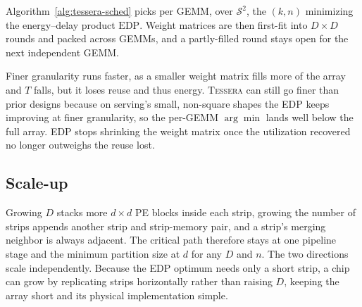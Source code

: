 Algorithm~\ref{alg:tessera-sched} picks per GEMM, over $\mathcal{S}^2$,
the $(k,n)$ minimizing the energy--delay product $\mathrm{EDP}$. Weight matrices are then first-fit into $D{\times}D$ rounds and packed
across GEMMs, and a partly-filled round stays open for the next
independent GEMM.

Finer granularity runs faster, as a smaller weight matrix fills more of the array
and $T$ falls, but it loses reuse and thus energy. \textsc{Tessera} can still go
finer than prior designs because on serving's small, non-square shapes the
EDP keeps improving at finer granularity, so the per-GEMM $\arg\min$
lands well below the full array. EDP stops shrinking the weight matrix once
the utilization recovered no longer outweighs the reuse lost.

\subsection{Scale-up}
\label{sec:scale}
\label{sec:scale:strip}
Growing $D$ stacks more
$d{\times}d$ PE blocks inside each strip, growing the number of strips appends another
strip and strip-memory pair, and a strip's merging neighbor is always
adjacent. The critical path therefore stays at one pipeline stage and
the minimum partition size at $d$ for any $D$ and $n$. The two directions
scale independently. Because the EDP optimum needs only a short
strip, a chip can grow by replicating strips
horizontally rather than raising $D$, keeping the array short and
its physical implementation simple.